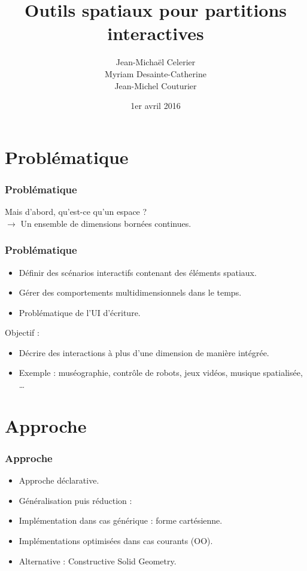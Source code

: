 \documentclass{beamer}
\title{Outils spatiaux pour partitions interactives}
\author{Jean-Michaël Celerier\\ Myriam Desainte-Catherine\\ Jean-Michel Couturier}
\date{1er avril 2016}
\begin{document}
\begin{frame}
    \centering
    \maketitle
\end{frame}

\section{Problématique}
\begin{frame}
    \frametitle{Problématique}
    \centering\Large
    Mais d'abord, qu'est-ce qu'un espace ?~\\
    \vspace{2cm}
    $\rightarrow$ Un ensemble de dimensions bornées continues.
\end{frame}

\begin{frame}
    \frametitle{Problématique}
    \Large
    \begin{itemize}
        \item Définir des scénarios interactifs contenant des éléments spatiaux.
        \item Gérer des comportements multidimensionnels dans le temps.
        \item Problématique de l'UI d'écriture.
    \end{itemize}
    
    Objectif : 
    
    \begin{itemize}
        \item Décrire des interactions à plus d'une dimension de manière intégrée.
        \item Exemple : muséographie, contrôle de robots, jeux vidéos, musique spatialisée, \dots
    \end{itemize}
    
\end{frame}

\section{Approche}
\begin{frame}
    \frametitle{Approche}
    \Large
    \begin{itemize}
        \item Approche déclarative.
        \item Généralisation puis réduction : 
        \item Implémentation dans cas générique : forme cartésienne.
        \item Implémentations optimisées dans cas courants (OO). 
        \item Alternative : Constructive Solid Geometry.
    \end{itemize}
\end{frame}
\end{document}
